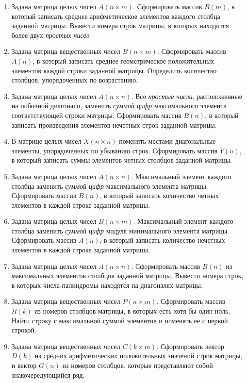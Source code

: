 \begin{enumerate}
\item Задана матрица целых чисел $A(n\times m)$. Сформировать массив
$B(m)$, в который записать среднее арифметическое элементов каждого столбца заданной матрицы.
Вывести номера строк матрицы, в которых находится более двух \emph{простых чисел}.
\item Задана матрица вещественных чисел $B(n\times m)$. Сформировать массив
$A(n)$, в который записать среднее геометрическое положительных элементов каждой строки
заданной матрицы. Определить количество столбцов, упорядоченных по возрастанию.
\item Задана матрица целых чисел $A(n\times n)$. Все \emph{простые числа}, расположенные на
побочной диагонали, заменить \emph{суммой цифр} максимального элемента соответствующей строки матрицы. Сформировать
массив $B(n)$, в который записать произведения элементов нечетных строк заданной матрицы.
\item В матрице целых чисел $X(n\times n)$ поменять местами диагональные элементы,  упорядоченных по
убыванию строк. Сформировать массив $Y(n)$, в который записать суммы элементов четных
столбцов заданной матрицы.
\item Задана матрица целых чисел $A(n\times n)$. Максимальный элемент каждого столбца заменить
\emph{суммой цифр} максимального элемента матрицы. Сформировать массив $B(n)$, в который
записать количество четных элементов в каждой строке заданной матрицы. 
\item Задана матрица целых чисел $B(n\times m)$. Максимальный элемент каждого столбца
заменить \emph{суммой цифр} модуля минимального элемента матрицы. Сформировать массив
$A(n)$, в который записать количество нечетных элементов в каждой строке заданной матрицы.
\item Задана матрица целых чисел $A(n\times n)$. Сформировать массив $B(n)$
из максимальных элементов столбцов заданной матрицы. Вывести номера строк, в которых
числа-палиндромы находятся на диагоналях матрицы. 
\item Задана матрица вещественных чисел $P(n\times m)$. Сформировать массив
$R(k)$ из номеров столбцов матрицы, в которых есть хотя бы один ноль. Найти строку с
максимальной суммой элементов и поменять ее с первой строкой.
\item Задана матрица вещественных чисел $C(k\times m)$. Сформировать вектор
$D(k)$ из средних арифметических положительных значений строк матрицы, и вектор
$G(n)$ из номеров столбцов, которые представляют собой знакочередующийся ряд.

\end{enumerate}
